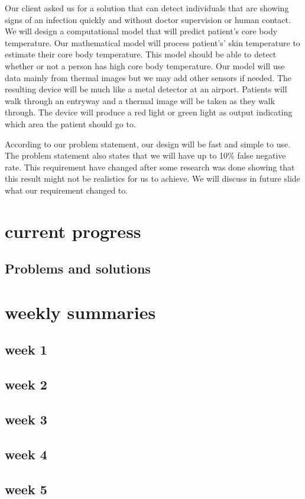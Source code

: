 \documentclass[onecolumn, draftclsnofoot,10pt, compsoc]{IEEEtran}
\begin{document}
Our client asked us for a  solution that can detect individuals that are showing signs of an infection quickly and without doctor supervision or human contact. We will design a computational model that will predict patient’s core body temperature. Our mathematical model will process patient's’ skin temperature to estimate their core body temperature. This model should be able to detect whether or not a person has high core body temperature.  Our model will use data mainly from thermal images but we may add other sensors if needed. The resulting device will be much like a metal detector at an airport. Patients will walk through an entryway and a thermal image will be taken as they walk through. The device will produce a red light or green light as output indicating which area the patient should go to.

According to our problem statement, our design will be fast and simple to use. The problem statement also states that we will have up to 10\% false negative rate. This requirement have changed after some research was done showing that this result might not be realistics for us to achieve. We will discuss in future slide what our requirement changed to. 


\section{current progress}
\subsection{Problems and solutions}
\section{weekly summaries}

\subsection{week 1}
\subsection{week 2}
\subsection{week 3}
\subsection{week 4}
\subsection{week 5}
\end{document}
